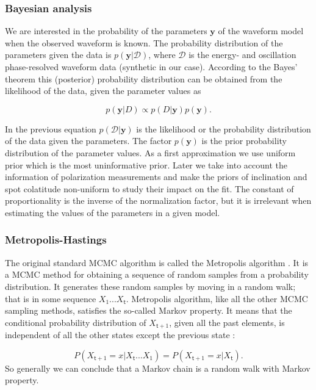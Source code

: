 \documentclass{wihuri}
\def\be{\begin{equation}}
\def\ee{\end{equation}}
\def\tstep{\mathsf{t}}
\begin{document}
\subsubsection{Bayesian analysis}

We are interested in the probability of the parameters $\textbf{y}$ of the waveform model when the observed waveform is known. The probability distribution of the parameters given the data is $p(\textbf{y}|\mathcal{D})$, where $\mathcal{D}$ is the energy- and oscillation phase-resolved waveform data (synthetic in our case). According to the Bayes' theorem this (posterior) probability distribution can be obtained from the likelihood of the data, given the parameter values as \cite{nattila_bayes}


\be \label{eq:bayes}
p(\textbf{y}|D) \propto p(D|\textbf{y})p(\textbf{y}).
\ee

In the previous equation $p(\mathcal{D}|\textbf{y})$ is the likelihood or the probability distribution of the data given the parameters. The factor $p(\textbf{y})$ is the prior probability distribution of the parameter values. As a first approximation we use uniform prior which is the most uninformative prior. Later we take into account the information of polarization measurements and make the priors of inclination and spot colatitude non-uniform to study their impact on the fit. The constant of proportionality is the inverse of the normalization factor, but it is irrelevant when estimating the values of the parameters in a given model. 


\subsubsection{Metropolis-Hastings}

The original standard MCMC algorithm is called the Metropolis algorithm \cite{metropolis53}\cite{hastings70}. %
It is a MCMC method for obtaining a sequence of random samples from a probability distribution. It generates these random samples by moving in a random walk; that is in some sequence $X_{1}...X_{\tstep}$. Metropolis algorithm, like all the other MCMC sampling methods, satisfies the so-called Markov property. It means that the conditional probability distribution of $X_{\tstep+1}$, given all the past elements, is independent of all the other states except the previous state \cite{kaiser}:

 \be \label{eq:markov_prop}
P(X_{\tstep +1} = x|X_{\tstep}. . . X_{1}) = P(X_{\tstep +1} = x|X_{\tstep}).
\ee
So generally we can conclude that a Markov chain is a random walk with Markov property.
 
\end{document}
